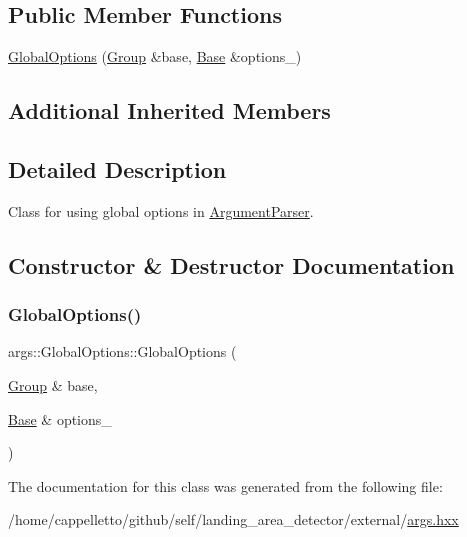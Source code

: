 \subsection*{Public Member Functions}
\begin{DoxyCompactItemize}
\item 
\hyperlink{classargs_1_1_global_options_abbf234c39d3f2a7ece77e006d03e8c52}{Global\+Options} (\hyperlink{classargs_1_1_group}{Group} \&base, \hyperlink{classargs_1_1_base}{Base} \&options\+\_\+)
\end{DoxyCompactItemize}
\subsection*{Additional Inherited Members}


\subsection{Detailed Description}
Class for using global options in \hyperlink{classargs_1_1_argument_parser}{Argument\+Parser}. 

\subsection{Constructor \& Destructor Documentation}
\mbox{\label{classargs_1_1_global_options_abbf234c39d3f2a7ece77e006d03e8c52}} 
\subsubsection{\texorpdfstring{Global\+Options()}{GlobalOptions()}}
{\footnotesize\ttfamily args\+::\+Global\+Options\+::\+Global\+Options (\begin{DoxyParamCaption}\item[{\hyperlink{classargs_1_1_group}{Group} \&}]{base,  }\item[{\hyperlink{classargs_1_1_base}{Base} \&}]{options\+\_\+ }\end{DoxyParamCaption})\hspace{0.3cm}{\ttfamily [inline]}}



The documentation for this class was generated from the following file\+:\begin{DoxyCompactItemize}
\item 
/home/cappelletto/github/self/landing\+\_\+area\+\_\+detector/external/\hyperlink{args_8hxx}{args.\+hxx}\end{DoxyCompactItemize}
